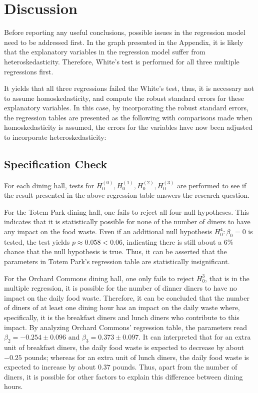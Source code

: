 \section{Discussion}
Before reporting any useful conclusions, possible issues in the regression model need to be addressed first. In the graph presented in the Appendix, it is likely that the explanatory variables in the regression model suffer from heteroskedasticity. Therefore, White's test is performed for all three multiple regressions first.

It yields that all three regressions failed the White's test, thus, it is necessary not to assume homoskedasticity, and compute the robust standard errors for these explanatory variables. In this case, by incorporating the robust standard errors, the regression tables are presented as the following with comparisons made when homoskedasticity is assumed, the errors for the variables have now been adjusted to incorporate heteroskedasticity:

 

\newpage

\subsection{Specification Check}
For each dining hall, tests for $H_0^{(0)}, H_0^{(1)}, H_0^{(2)}, H_0^{(3)}$ are performed to see if the result presented in the above regression table answers the research question.

For the Totem Park dining hall, one fails to reject all four null hypotheses. This indicates that it is statistically possible for none of the number of diners to have any impact on the food waste. Even if an additional null hypothesis $H_0^{4}: \beta_0 = 0$ is tested, the test yields $p \approx 0.058 < 0.06$, indicating there is still about a $6\%$ chance that the null hypothesis is true. Thus, it can be asserted that the parameters in Totem Park's regression table are statistically insignificant.

For the Orchard Commons dining hall, one only fails to reject $H_0^{3}$, that is in the multiple regression, it is possible for the number of dinner diners to have no impact on the daily food waste. Therefore, it can be concluded that the number of diners of at least one dining hour has an impact on the daily waste where, specifically, it is the breakfast diners and lunch diners who contribute to this impact. By analyzing Orchard Commons' regression table, the parameters read $\beta_2 = -0.254 \pm 0.096$ and $\beta_3 = 0.373 \pm 0.097$. It can interpreted that for an extra unit of breakfast diners, the daily food waste is expected to decrease by about $-0.25$ pounds; whereas for an extra unit of lunch diners, the daily food waste is expected to increase by about $0.37$ pounds. Thus, apart from the number of diners, it is possible for other factors to explain this difference between dining hours.

